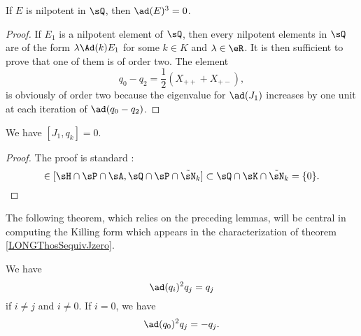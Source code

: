 \begin{proposition}			\label{LONGEtOrdreDeux}
	If $E$ is nilpotent in $\sQ$, then $\ad(E)^3=0$.
\end{proposition}

\begin{proof}
	If $E_1$ is a nilpotent element of $\sQ$, then every nilpotent elements in $\sQ$ are of the form $\lambda\Ad(k)E_1$ for some $k\in K$ and $\lambda\in\eR$\cite{These}. It is then sufficient to prove that one of them is of order two. The element
	\begin{equation}		\label{LONGEqDecqzmoinsqDeux}
		q_0-q_2=\frac{ 1 }{2}(X_{++}+X_{+-}),
	\end{equation}
	is obviously of order two because the eigenvalue for $\ad(J_1)$ increases by one unit at each iteration of $\ad(q_0-q_2)$.
\end{proof}

\begin{lemma}
	We have $[J_1,q_k]=0$.
\end{lemma}

\begin{proof}
	The proof is standard :
	\begin{equation}
		[J_1,q_k]\in[\sH\cap\sP\cap\sA,\sQ\cap\sP\cap\tilde\sN_k]\subset\sQ\cap\sK\cap\tilde\sN_k=\{ 0 \}.
	\end{equation}
\end{proof}

The following theorem, which relies on the preceding lemmas, will be central in computing the Killing form which appears in the characterization of theorem \ref{LONGThosSequivJzero}.
%
\begin{theorem}			\label{LONGThoAdESqqq}
	We have
	\begin{equation}
		\ad(q_i)^2q_j=q_j
	\end{equation}
	if $i\neq j$ and $i\neq 0$. If $i=0$, we have
	\begin{equation}
		\ad(q_0)^2q_j=-q_j.
	\end{equation}
\end{theorem}


